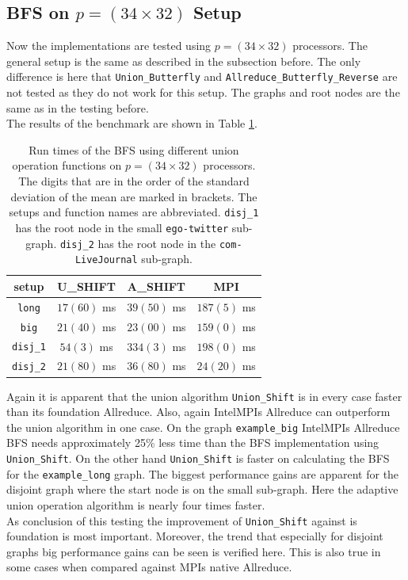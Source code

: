 \subsection{BFS on $p=(34\times 32)$ Setup}
Now the implementations are tested using $p=(34\times32)$ processors. The general setup is the same as described in the subsection before. The only difference is here that \texttt{Union\_Butterfly} and \texttt{All\-re\-duce\_But\-ter\-fly\_Reverse} are not tested as they do not work for this setup. The graphs and root nodes are the same as in the testing before.\\
The results of the benchmark are shown in Table \ref{table:34x32BFS}.
\begin{table}[h]
	\centering
	\begin{tabular}{|c|| c| c | c|} \hline
		setup & U\_SHIFT & A\_SHIFT & MPI\\
		\hline \hline
		\texttt{long} & $17(60)$ ms & $39(50)$ ms  & $187(5)$ ms\\ \hline
		\texttt{big}  & $21(40)$ ms &  $23(00)$ ms& $159(0)$ ms\\ \hline
		\texttt{disj\_1} & $54(3)$ ms \hspace{1ex}&  $334(3)$ ms&   $198(0)$ ms\\ \hline
		\texttt{disj\_2} & $21(80)$ ms & $36(80)$ ms & $24(20) $ ms\\ \hline
	\end{tabular}
	\caption{Run times of the BFS using different union operation functions on $p=(34\times32)$ processors. The digits that are in the order of the standard deviation of the mean are marked in brackets. The setups and function names are abbreviated. \texttt{disj\_1} has the root node in the small \texttt{ego-twitter} sub-graph. \texttt{disj\_2} has the root node in the \texttt{com-LiveJournal} sub-graph.}
	\label{table:34x32BFS}
\end{table}
Again it is apparent that the union algorithm \texttt{Union\_Shift} is in every case faster than its foundation Allreduce. Also, again IntelMPIs Allreduce can outperform the union algorithm in one case. On the graph \texttt{example\_big} IntelMPIs Allreduce BFS needs approximately 25\% less time than the BFS implementation using \texttt{Union\_Shift}. On the other hand \texttt{Union\_Shift} is faster on calculating the BFS for the \texttt{example\_long} graph. The biggest performance gains are apparent for the disjoint graph where the start node is on the small sub-graph. Here the adaptive union operation algorithm is nearly four times faster.\\
As conclusion of this testing the improvement of \texttt{Union\_Shift} against is foundation is most important. Moreover, the trend that especially for disjoint graphs big performance gains can be seen is verified here. This is also true in some cases when compared against MPIs native Allreduce.



















